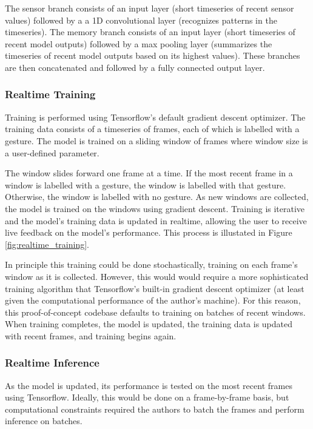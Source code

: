 \documentclass{nime-alternate} %
\begin{document}
The sensor branch consists of an input layer (short timeseries of recent sensor values) followed by a  a 1D convolutional layer (recognizes patterns in the timeseries). The memory branch consists of an input layer (short timeseries of recent model outputs) followed by a max pooling layer (summarizes the timeseries of recent model outputs based on its highest values). These branches are then concatenated and followed by a fully connected output layer. 




\subsubsection{Realtime Training}
Training is performed using Tensorflow's default gradient descent optimizer. The training data consists of a timeseries of frames, each of which is labelled with a gesture. The model is trained on a sliding window of frames where window size is a user-defined parameter.

The window slides forward one frame at a time. If the most recent frame in a window is labelled with a gesture, the window is labelled with that gesture. Otherwise, the window is labelled with no gesture. As new windows are collected, the model is trained on the windows using gradient descent. Training is iterative and the model's training data is updated in realtime, allowing the user to receive live feedback on the model's performance. This process is illustated in Figure \ref{fig:realtime_training}.

In principle this training could be done stochastically, training on each frame's window as it is collected. However, this would  would require a more sophisticated training algorithm that Tensorflow's built-in gradient descent optimizer (at least given the computational performance of the author's machine). For this reason, this proof-of-concept codebase defaults to training on batches of recent windows. When training completes, the model is updated, the training data is updated with recent frames, and training begins again.

\subsubsection{Realtime Inference}
As the model is updated, its performance is tested on the most recent frames using Tensorflow. Ideally, this would be done on a frame-by-frame basis, but computational constraints required the authors to batch the frames and perform inference on batches.
\end{document}
